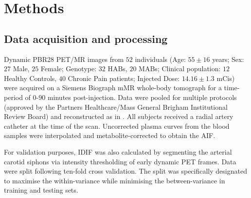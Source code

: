 
\section{Methods} \label{sec:methods} 
\vspace{-0.15cm}
    \subsection{Data acquisition and processing}\label{sec:dataproc}
        Dynamic \gls{PBR28} \gls{PET}/\gls{MR} images from $52$ individuals (Age: $55 \pm 16$ years; Sex: $27$ Male, $25$ Female; Genotype: $32$ \glspl{HAB}, $20$ \glspl{MAB}; Clinical population: $12$ Healthy Controls, $40$ Chronic Pain patients; Injected Dose: $14.16 \pm 1.3$ \glspl{mCi}) were acquired on a Siemens Biograph mMR whole-body tomograph for a time-period of $0$-$90$ minutes post-injection. Data were pooled for multiple protocols (approved by the Partners Healthcare/Mass General Brigham Institutional Review Board) and reconstructed as in \cite{Brusaferri2022ThePandemic}. All subjects received a radial artery catheter at the time of the scan. Uncorrected plasma curves from the blood samples were interpolated and metabolite-corrected to obtain the \gls{AIF}. %
        
        For validation purposes, \gls{IDIF} was also calculated by segmenting the arterial carotid siphons via intensity thresholding of early  dynamic \gls{PET} frames. Data were split following ten-fold cross validation. The split was specifically designated to maximise the within-variance while minimising the between-variance in training and testing sets.

    \vspace{-0.5cm}
    
